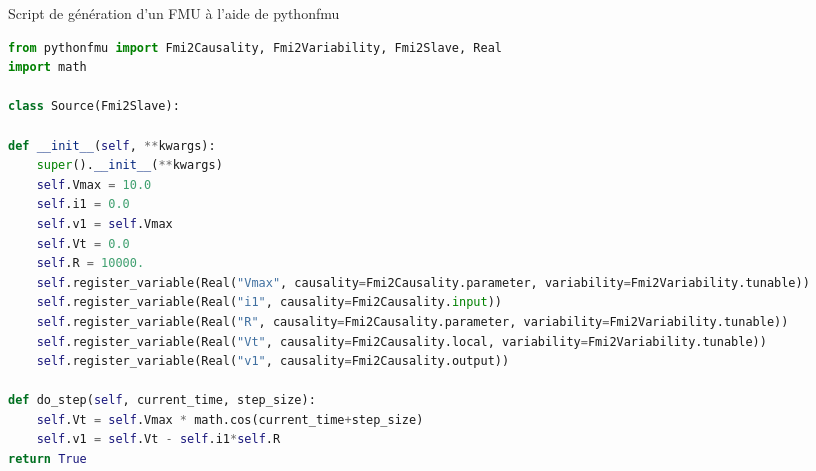 \begin{table}[hbt!]
    \caption{Script de génération d'un FMU à l'aide de pythonfmu}
    \begin{lstlisting}[style=vscode, language=python]
from pythonfmu import Fmi2Causality, Fmi2Variability, Fmi2Slave, Real
import math

class Source(Fmi2Slave):

def __init__(self, **kwargs):
    super().__init__(**kwargs)
    self.Vmax = 10.0
    self.i1 = 0.0
    self.v1 = self.Vmax
    self.Vt = 0.0
    self.R = 10000.
    self.register_variable(Real("Vmax", causality=Fmi2Causality.parameter, variability=Fmi2Variability.tunable))
    self.register_variable(Real("i1", causality=Fmi2Causality.input))
    self.register_variable(Real("R", causality=Fmi2Causality.parameter, variability=Fmi2Variability.tunable))
    self.register_variable(Real("Vt", causality=Fmi2Causality.local, variability=Fmi2Variability.tunable))
    self.register_variable(Real("v1", causality=Fmi2Causality.output))

def do_step(self, current_time, step_size):
    self.Vt = self.Vmax * math.cos(current_time+step_size)
    self.v1 = self.Vt - self.i1*self.R
return True
        \end{lstlisting}
        \label{tab:A3}
\end{table}

\newpage

